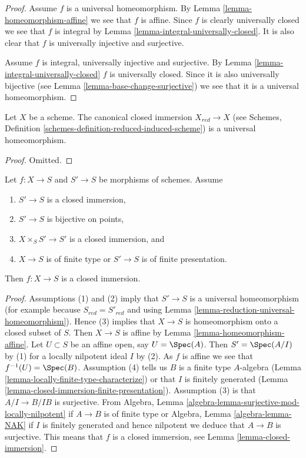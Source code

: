 \begin{proof}
Assume $f$ is a universal homeomorphism. By
Lemma \ref{lemma-homeomorphism-affine}
we see that $f$ is affine. Since $f$ is clearly universally closed we
see that $f$ is integral by
Lemma \ref{lemma-integral-universally-closed}.
It is also clear that $f$ is universally injective and surjective.

\medskip\noindent
Assume $f$ is integral, universally injective and surjective. By
Lemma \ref{lemma-integral-universally-closed}
$f$ is universally closed. Since it is also universally bijective (see
Lemma \ref{lemma-base-change-surjective})
we see that it is a universal homeomorphism.
\end{proof}

\begin{lemma}
\label{lemma-reduction-universal-homeomorphism}
Let $X$ be a scheme. The canonical closed immersion $X_{red} \to X$ (see
Schemes, Definition \ref{schemes-definition-reduced-induced-scheme})
is a universal homeomorphism.
\end{lemma}

\begin{proof}
Omitted.
\end{proof}

\begin{lemma}
\label{lemma-check-closed-infinitesimally}
Let $f : X \to S$ and $S' \to S$ be morphisms of schemes.
Assume
\begin{enumerate}
\item $S' \to S$ is a closed immersion,
\item $S' \to S$ is bijective on points,
\item $X \times_S S' \to S'$ is a closed immersion, and
\item $X \to S$ is of finite type or $S' \to S$ is of finite presentation.
\end{enumerate}
Then $f : X \to S$ is a closed immersion.
\end{lemma}

\begin{proof}
Assumptions (1) and (2) imply that $S' \to S$ is a universal homeomorphism
(for example because $S_{red} = S'_{red}$ and using
Lemma \ref{lemma-reduction-universal-homeomorphism}).
Hence (3) implies that $X \to S$ is homeomorphism onto a
closed subset of $S$. Then $X \to S$ is affine by
Lemma \ref{lemma-homeomorphism-affine}.
Let $U \subset S$ be an affine open, say $U = \Spec(A)$. Then $S' = \Spec(A/I)$
by (1) for a locally nilpotent ideal $I$ by (2). As $f$ is affine we see that
$f^{-1}(U) = \Spec(B)$.
Assumption (4) tells us $B$ is a finite type $A$-algebra
(Lemma \ref{lemma-locally-finite-type-characterize}) or
that $I$ is finitely generated
(Lemma \ref{lemma-closed-immersion-finite-presentation}).
Assumption (3) is that $A/I \to B/IB$ is surjective. From
Algebra, Lemma \ref{algebra-lemma-surjective-mod-locally-nilpotent}
if $A \to B$ is of finite type
or Algebra, Lemma \ref{algebra-lemma-NAK} if $I$ is finitely generated
and hence nilpotent we deduce that $A \to B$ is surjective.
This means that $f$ is a closed immersion, see
Lemma \ref{lemma-closed-immersion}.
\end{proof}





